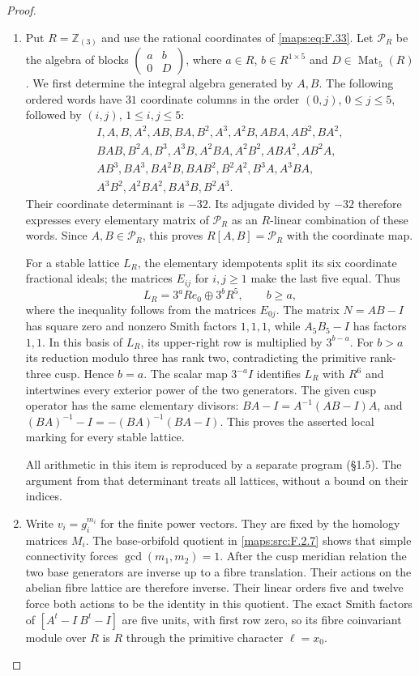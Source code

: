 \begin{proof}
\begin{enumerate}[label={$\langle1\rangle$\arabic*.}]
\item Put $R=\mathbb Z_{(3)}$ and use the rational coordinates of
\eqref{maps:eq:F.33}.  Let $\mathcal P_R$ be the algebra of blocks
$\left(\begin{smallmatrix}a&b\\0&D\end{smallmatrix}\right)$,
where $a\in R$, $b\in R^{1\times5}$ and $D\in\operatorname{Mat}_5(R)$.
We first determine the integral algebra generated by $A,B$.
The following ordered words have $31$ coordinate columns in the order
$(0,j)$, $0\leq j\leq5$, followed by $(i,j)$,
$1\leq i,j\leq5$:
\[
\begin{gathered}
I,A,B,A^2,AB,BA,B^2,A^3,A^2B,ABA,AB^2,BA^2,\\
BAB,B^2A,B^3,A^3B,A^2BA,A^2B^2,ABA^2,AB^2A,\\
AB^3,BA^3,BA^2B,BAB^2,B^2A^2,B^3A,A^3BA,\\
A^3B^2,A^2BA^2,BA^3B,B^2A^3.
\end{gathered}
\]
Their coordinate determinant is $-32$.  Its adjugate divided by
$-32$ therefore expresses every elementary matrix of
$\mathcal P_R$ as an $R$-linear combination of these words.
Since $A,B\in\mathcal P_R$, this proves
$R[A,B]=\mathcal P_R$ with the coordinate map.

For a stable lattice $L_R$, the elementary idempotents split its
six coordinate fractional ideals; the matrices $E_{ij}$ for
$i,j\geq1$ make the last five equal.  Thus
\[
 L_R=3^aRe_0\oplus3^bR^5,\qquad b\geq a,
\]
where the inequality follows from the matrices $E_{0j}$.
The matrix $N=AB-I$ has square zero and nonzero Smith factors
$1,1,1$, while $A_5B_5-I$ has factors $1,1$.
In this basis of $L_R$, its upper-right row is multiplied by
$3^{b-a}$.  For $b>a$ its reduction modulo three has rank two,
contradicting the primitive rank-three cusp.  Hence $b=a$.
The scalar map $3^{-a}I$ identifies $L_R$ with $R^6$
and intertwines every exterior power of the two generators.
The given cusp operator has the same elementary divisors:
$BA-I=A^{-1}(AB-I)A$, and
$(BA)^{-1}-I=-(BA)^{-1}(BA-I)$.
This proves the asserted local marking for every stable lattice.

All arithmetic in this item is reproduced by a separate program (\S1.5).
The argument from that determinant treats all lattices, without a
bound on their indices.

\item Write $v_i=g_i^{m_i}$ for the finite power vectors.
They are fixed by the homology matrices $M_i$.
The base-orbifold quotient in \cref{maps:src:F.2.7} shows that
simple connectivity forces $\gcd(m_1,m_2)=1$.
After the cusp meridian relation the two base generators are
inverse up to a fibre translation.  Their actions on the abelian
fibre lattice are therefore inverse.  Their linear orders five
and twelve force both actions to be the identity in this quotient.
The exact Smith factors of $[A^t-I\ B^t-I]$ are five units,
with first row zero, so its fibre coinvariant module over $R$
is $R$ through the primitive character $\ell=x_0$.


\end{enumerate}
\end{proof}
